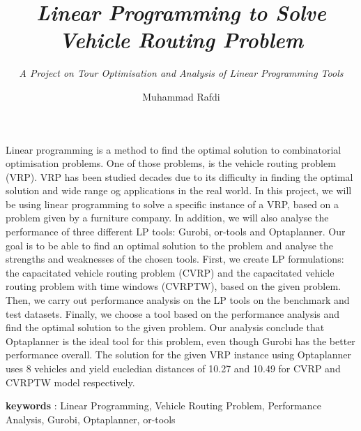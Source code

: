 \documentclass[a4paper,12pt,numbered,print,index]{report/thesisFormat}
\title{\textit{Linear Programming to Solve\\Vehicle Routing Problem}}
\subtitle{\textit{A Project on Tour Optimisation and Analysis of Linear Programming Tools}}
\author{Muhammad Rafdi}
\newenvironment{romanpages}{
  \setcounter{page}{1}
  \renewcommand{\thepage}{\roman{page}}}
{\newpage\renewcommand{\thepage}{\arabic{page}}}
\begin{document}
\begin{romanpages}

\begin{titlepage}
  \maketitle
\end{titlepage}

\begin{abstract2}

    Linear programming is a method to find the optimal solution to combinatorial optimisation problems. One of those
    problems, is the vehicle routing problem (VRP). VRP has been studied decades due to its difficulty in finding the optimal solution
     and wide range og applications in the real world.
    In this project, we will be using linear programming to solve a specific instance of a VRP, based on a problem given by
    a furniture company. In addition, we will also analyse the performance of three different LP tools: Gurobi, or-tools and
    Optaplanner. Our goal is to be able to find an optimal solution to the problem and analyse the strengths and weaknesses
    of the chosen tools. First, we create LP formulations: the capacitated vehicle routing problem (CVRP) and the capacitated
     vehicle routing problem with time windows (CVRPTW), based on the given problem. Then, we carry out performance
    analysis on the LP tools on the benchmark and test datasets. Finally, we choose a tool based
    on the performance analysis and find the optimal solution to the given problem. Our analysis conclude that Optaplanner is the
    ideal tool for this problem, even though Gurobi has the better performance overall. The solution for the given VRP instance
    using Optaplanner uses 8 vehicles and yield eucledian distances of 10.27 and 10.49 for CVRP and CVRPTW model respectively.

   \vspace{1.5cm}
   \textbf{keywords} : Linear Programming, Vehicle Routing Problem, Performance Analysis, Gurobi, Optaplanner, or-tools

\end{abstract2}


\setcounter{page}{1}

\tableofcontents

\listoffigures

\listoftables

\end{romanpages}
\end{document}
